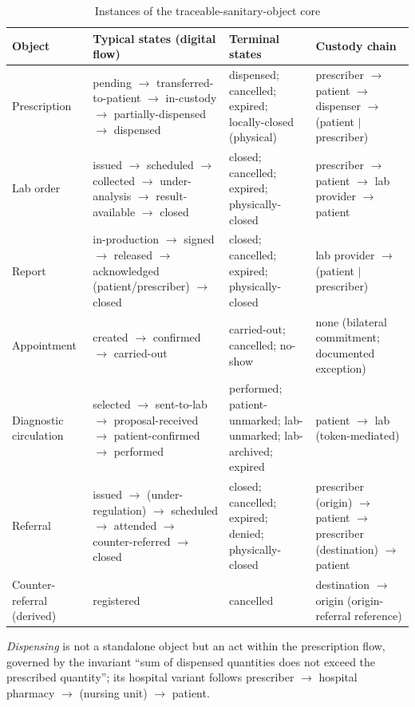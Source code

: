 \documentclass[conference]{IEEEtran}
\begin{document}
\begin{table}[t]
\caption{Instances of the traceable-sanitary-object core}
\label{tab:core}
\centering
\renewcommand{\arraystretch}{1.3}
\begin{tabular}{|l|p{6.4cm}|p{3.3cm}|p{4.0cm}|}
\hline
\textbf{Object} & \textbf{Typical states (digital flow)} & \textbf{Terminal states} & \textbf{Custody chain} \\
\hline
Prescription & pending $\rightarrow$ transferred-to-patient $\rightarrow$ in-custody $\rightarrow$ partially-dispensed $\rightarrow$ dispensed & dispensed; cancelled; expired; locally-closed (physical) & prescriber $\rightarrow$ patient $\rightarrow$ dispenser $\rightarrow$ (patient $|$ prescriber) \\
\hline
Lab order & issued $\rightarrow$ scheduled $\rightarrow$ collected $\rightarrow$ under-analysis $\rightarrow$ result-available $\rightarrow$ closed & closed; cancelled; expired; physically-closed & prescriber $\rightarrow$ patient $\rightarrow$ lab provider $\rightarrow$ patient \\
\hline
Report & in-production $\rightarrow$ signed $\rightarrow$ released $\rightarrow$ acknowledged (patient/prescriber) $\rightarrow$ closed & closed; cancelled; expired; physically-closed & lab provider $\rightarrow$ (patient $|$ prescriber) \\
\hline
Appointment & created $\rightarrow$ confirmed $\rightarrow$ carried-out & carried-out; cancelled; no-show & none (bilateral commitment; documented exception) \\
\hline
Diagnostic circulation & selected $\rightarrow$ sent-to-lab $\rightarrow$ proposal-received $\rightarrow$ patient-confirmed $\rightarrow$ performed & performed; patient-unmarked; lab-unmarked; lab-archived; expired & patient $\rightarrow$ lab (token-mediated) \\
\hline
Referral & issued $\rightarrow$ (under-regulation) $\rightarrow$ scheduled $\rightarrow$ attended $\rightarrow$ counter-referred $\rightarrow$ closed & closed; cancelled; expired; denied; physically-closed & prescriber (origin) $\rightarrow$ patient $\rightarrow$ prescriber (destination) $\rightarrow$ patient \\
\hline
Counter-referral (derived) & registered & cancelled & destination $\rightarrow$ origin (origin-referral reference) \\
\hline
\end{tabular}
\end{table}

\emph{Dispensing} is not a standalone object but an act within the prescription flow, governed by the invariant ``sum of dispensed quantities does not exceed the prescribed quantity''; its hospital variant follows prescriber $\rightarrow$ hospital pharmacy $\rightarrow$ (nursing unit) $\rightarrow$ patient.
\end{document}
